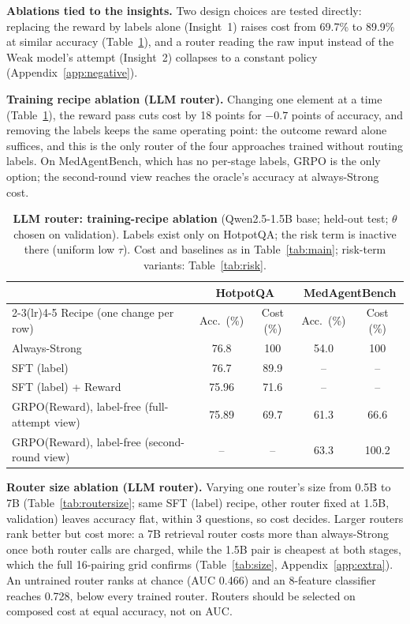 \documentclass{article}
\begin{document}
\textbf{Ablations tied to the insights.} Two design choices are tested directly: replacing the reward by labels alone (Insight~1) raises cost from 69.7\% to 89.9\% at similar accuracy (Table~\ref{tab:ablation}), and a router reading the raw input instead of the Weak model's attempt (Insight~2) collapses to a constant policy (Appendix~\ref{app:negative}).

\textbf{Training recipe ablation (LLM router).} Changing one element at a time (Table~\ref{tab:ablation}), the reward pass cuts cost by 18 points for $-0.7$ points of accuracy, and removing the labels keeps the same operating point: the outcome reward alone suffices, and this is the only router of the four approaches trained without routing labels. On MedAgentBench, which has no per-stage labels, GRPO is the only option; the second-round view reaches the oracle's accuracy at always-Strong cost.

\begin{table}[!htb]
\caption{\textbf{LLM router: training-recipe ablation} (Qwen2.5-1.5B base; held-out test; $\theta$ chosen on validation). Labels exist only on HotpotQA; the risk term is inactive there (uniform low $\tau$). Cost and baselines as in Table~\ref{tab:main}; risk-term variants: Table~\ref{tab:risk}.}
\label{tab:ablation}
\centering\small
\begin{tabular}{@{}lcccc@{}}
\toprule
& \multicolumn{2}{c}{HotpotQA} & \multicolumn{2}{c}{MedAgentBench}\\
\cmidrule(lr){2-3}\cmidrule(lr){4-5}
Recipe (one change per row) & Acc.\ (\%) & Cost (\%) & Acc.\ (\%) & Cost (\%)\\
\midrule
Always-Strong & 76.8 & 100 & 54.0 & 100\\
\midrule
SFT (label) & 76.7 & 89.9 & -- & --\\
SFT (label) + Reward & 75.96 & 71.6 & -- & --\\
GRPO(Reward), label-free (full-attempt view) & 75.89 & 69.7 & 61.3 & 66.6\\
GRPO(Reward), label-free (second-round view) & -- & -- & 63.3 & 100.2\\
\bottomrule
\end{tabular}
\end{table}

\textbf{Router size ablation (LLM router).} Varying one router's size from 0.5B to 7B (Table~\ref{tab:routersize}; same SFT (label) recipe, other router fixed at 1.5B, validation) leaves accuracy flat, within 3 questions, so cost decides. Larger routers rank better but cost more: a 7B retrieval router costs more than always-Strong once both router calls are charged, while the 1.5B pair is cheapest at both stages, which the full 16-pairing grid confirms (Table~\ref{tab:size}, Appendix~\ref{app:extra}). An untrained router ranks at chance (AUC 0.466) and an 8-feature classifier reaches 0.728, below every trained router. Routers should be selected on composed cost at equal accuracy, not on AUC.
\end{document}
